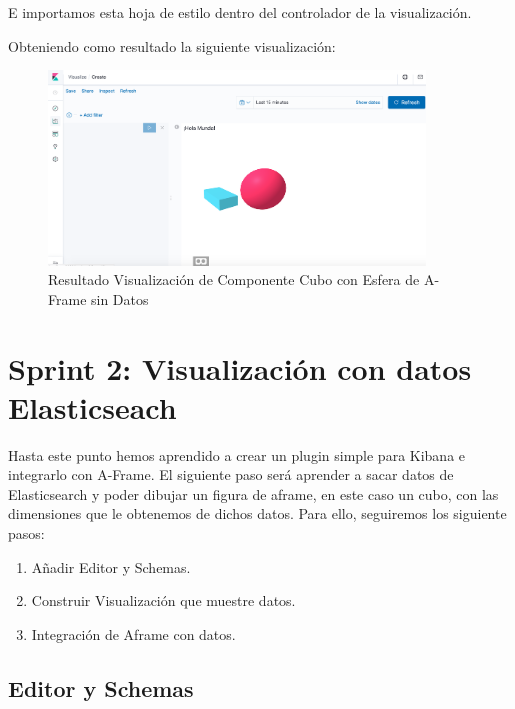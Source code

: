 \documentclass[a4paper, 12pt]{book}
\begin{document}


E importamos esta hoja de estilo dentro del controlador de la visualización.



Obteniendo como resultado la siguiente visualización:

\begin{figure}[H]
  \centering
  \includegraphics[width=10cm, keepaspectratio]{img/development/resultado-componente-box.png}
  \caption{Resultado Visualización de Componente Cubo con Esfera de A-Frame sin Datos}
  \label{fig:resultadocomponente}
\end{figure}





\section{Sprint 2: Visualización con datos Elasticseach }
\label{sec:sprint2}

Hasta este punto hemos aprendido a crear un plugin simple para Kibana e integrarlo con A-Frame. El siguiente paso será aprender a sacar datos de Elasticsearch y poder dibujar un figura de aframe, en este caso un cubo, con las dimensiones que le obtenemos de dichos datos. Para ello, seguiremos los siguiente pasos:
\begin{enumerate}
    \item Añadir Editor y Schemas.
    \item Construir Visualización que muestre datos.
    \item Integración de Aframe con datos.
\end{enumerate}

\subsection{Editor y Schemas}
\label{sec:schemas}
\end{document}
